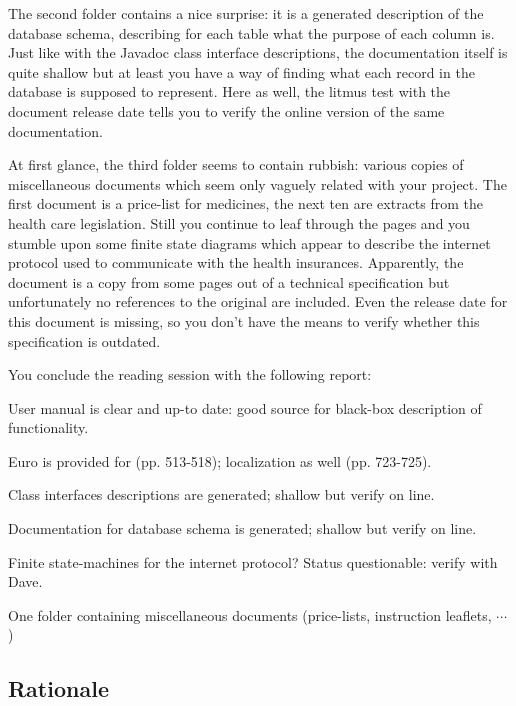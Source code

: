 \documentclass[a4paper,10pt,twoside]{book}
\begin{document}
The second folder contains a nice surprise: it is a generated description of the database schema, describing for each table what the purpose of each column is. Just like with the Javadoc class interface descriptions, the documentation itself is quite shallow but at least you have a way of finding what each record in the database is supposed to represent. Here as well, the litmus test with the document release date tells you to verify the online version of the same documentation.

At first glance, the third folder seems to contain rubbish: various copies of miscellaneous documents which seem only vaguely related with your project. The first document is a price-list for medicines, the next ten are extracts from the health care legislation. Still you continue to leaf through the pages and you stumble upon some finite state diagrams which appear to describe the internet protocol used to communicate with the health insurances. Apparently, the document is a copy from some pages out of a technical specification but unfortunately no references to the original are included. Even the release date for this document is missing, so you don't have the means to verify whether this specification is outdated.

You conclude the reading session with the following report:

\begin{bulletlist}
  \item User manual is clear and up-to date: good source for black-box description of functionality.

  \item Euro is provided for (pp. 513-518); localization as well (pp. 723-725).

  \item Class interfaces descriptions are generated; shallow but verify on line.

  \item Documentation for database schema is generated; shallow but verify on line.

  \item Finite state-machines for the internet protocol? Status questionable: verify with Dave.

  \item One folder containing miscellaneous documents (price-lists, instruction leaflets, $\cdots$)
\end{bulletlist}

\subsection*{Rationale}
\end{document}
